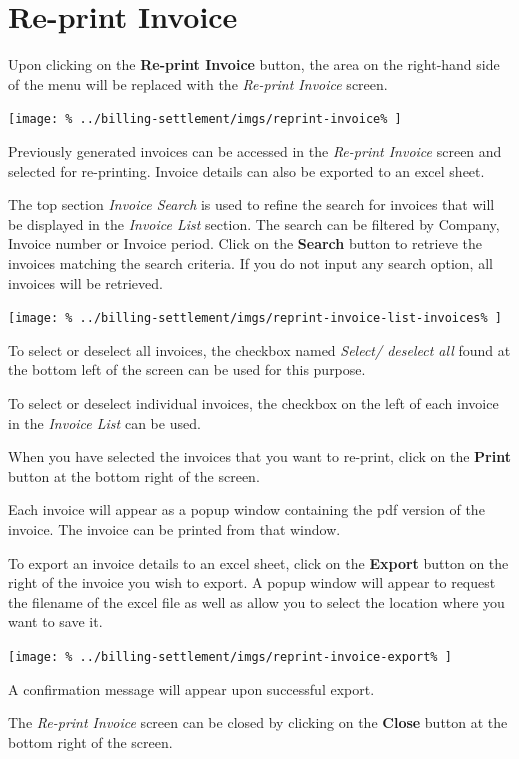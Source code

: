 \documentclass[../main/main]{subfiles}
\begin{document}
\newpage
\section{Re-print Invoice}
\label{sec:re-print-invoice}

Upon clicking on the \textbf{Re-print Invoice} button,
the area on the right-hand side of the menu will be replaced with the
\emph{Re-print Invoice} screen.

\texttt{[image: \%
  ../billing-settlement/imgs/reprint-invoice\%
]}

Previously generated invoices can be accessed in the \emph{Re-print Invoice}
screen and selected for re-printing. Invoice details can also be exported
to an excel sheet.

The top section \emph{Invoice Search} is used to refine the search for invoices
that will be displayed in the \emph{Invoice List} section.
The search can be filtered by Company, Invoice number or Invoice period.
Click on the \textbf{Search} button to retrieve the invoices matching the search
criteria. If you do not input any search option, all invoices will be retrieved.

\texttt{[image: \%
  ../billing-settlement/imgs/reprint-invoice-list-invoices\%
]}

To select or deselect all invoices, the checkbox named
\emph{Select/ deselect all} found at the bottom left of the screen can be used
for this purpose.

To select or deselect individual invoices, the checkbox on the left of each
invoice in the \emph{Invoice List} can be used.

When you have selected the invoices that you want to re-print, click on the
\textbf{Print} button at the bottom right of the screen.

Each invoice will appear as a popup window containing the pdf version of
the invoice. The invoice can be printed from that window.

To export an invoice details to an excel sheet, click on the \textbf{Export}
button on the right of the invoice you wish to export. A popup window will
appear to request the filename of the excel file as well as allow you to select
the location where you want to save it.

\texttt{[image: \%
  ../billing-settlement/imgs/reprint-invoice-export\%
]}

A confirmation message will appear upon successful export.

The \emph{Re-print Invoice} screen can be closed by clicking on the
\textbf{Close} button at the bottom right of the screen.
\end{document}
